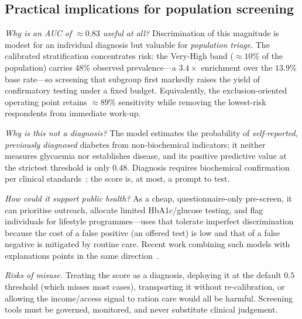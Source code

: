 \documentclass[conference]{IEEEtran}
\begin{document}
\subsection{Practical implications for population screening}
\emph{Why is an AUC of $\approx0.83$ useful at all?} Discrimination of this magnitude is
modest for an individual diagnosis but valuable for \emph{population triage}. The
calibrated stratification concentrates risk: the Very-High band ($\approx10\%$ of the
population) carries $48\%$ observed prevalence---a $3.4\times$ enrichment over the
$13.9\%$ base rate---so screening that subgroup first markedly raises the yield of
confirmatory testing under a fixed budget. Equivalently, the exclusion-oriented operating
point retains $\approx89\%$ sensitivity while removing the lowest-risk respondents from
immediate work-up.

\emph{Why is this not a diagnosis?} The model estimates the probability of
\emph{self-reported, previously diagnosed} diabetes from non-biochemical indicators; it
neither measures glycaemia nor establishes disease, and its positive predictive value at
the strictest threshold is only $0.48$. Diagnosis requires biochemical confirmation per
clinical standards~\cite{elsayed2023classification}; the score is, at most, a prompt to
test.

\emph{How could it support public health?} As a cheap, questionnaire-only pre-screen, it
can prioritise outreach, allocate limited HbA1c/glucose testing, and flag individuals for
lifestyle programmes---uses that tolerate imperfect discrimination because the cost of a
false positive (an offered test) is low and that of a false negative is mitigated by
routine care. Recent work combining such models with explanations points in the same
direction~\cite{tasin2023diabetes}.

\emph{Risks of misuse.} Treating the score as a diagnosis, deploying it at the default
$0.5$ threshold (which misses most cases), transporting it without re-calibration, or
allowing the income/access signal to ration care would all be harmful. Screening tools
must be governed, monitored, and never substitute clinical judgement.
\end{document}

